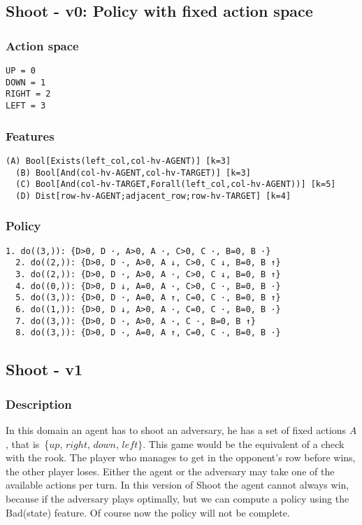 \documentclass[a4paper]{article}
\begin{document}
\subsection{Shoot - v0: Policy with fixed action space}

\subsubsection{Action space}
\begin{Verbatim}[fontsize=\footnotesize]
UP = 0
DOWN = 1
RIGHT = 2
LEFT = 3
\end{Verbatim}

\subsubsection{Features}
\begin{Verbatim}[fontsize=\footnotesize]
  (A) Bool[Exists(left_col,col-hv-AGENT)] [k=3]
  (B) Bool[And(col-hv-AGENT,col-hv-TARGET)] [k=3]
  (C) Bool[And(col-hv-TARGET,Forall(left_col,col-hv-AGENT))] [k=5]
  (D) Dist[row-hv-AGENT;adjacent_row;row-hv-TARGET] [k=4]

\end{Verbatim}

\subsubsection{Policy}
\begin{Verbatim}[fontsize=\footnotesize]
  1. do((3,)): {D>0, D ·, A>0, A ·, C>0, C ·, B=0, B ·}
  2. do((2,)): {D>0, D ·, A>0, A ↓, C>0, C ↓, B=0, B ↑}
  3. do((2,)): {D>0, D ·, A>0, A ·, C>0, C ↓, B=0, B ↑}
  4. do((0,)): {D>0, D ↓, A=0, A ·, C>0, C ·, B=0, B ·}
  5. do((3,)): {D>0, D ·, A=0, A ↑, C=0, C ·, B=0, B ↑}
  6. do((1,)): {D>0, D ↓, A>0, A ·, C=0, C ·, B=0, B ·}
  7. do((3,)): {D>0, D ·, A>0, A ·, C ·, B=0, B ↑}
  8. do((3,)): {D>0, D ·, A=0, A ↑, C=0, C ·, B=0, B ·}
\end{Verbatim}

\subsection{Shoot - v1}
\subsubsection{Description}
In this domain an agent has to shoot an adversary, he has a set of fixed actions $A$, that is~\{$up$, $right$, $down$, $left\}$. This game would be the equivalent of a check with the rook. The player who manages to get in the opponent's row before wins, the other player loses. Either the agent or the adversary may take one of the available actions per turn. In this version of Shoot the agent cannot always win, because if the adversary plays optimally, but we can compute a policy using the Bad(state) feature. Of course now the policy will not be complete.
\end{document}
